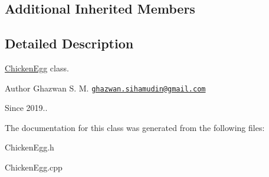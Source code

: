 \subsection*{Additional Inherited Members}


\subsection{Detailed Description}
\hyperlink{classChickenEgg}{Chicken\+Egg} class.

\begin{DoxyAuthor}{Author}
Ghazwan S. M. \href{mailto:ghazwan.sihamudin@gmail.com}{\tt ghazwan.\+sihamudin@gmail.\+com} 
\end{DoxyAuthor}
\begin{DoxySince}{Since}
2019.. 
\end{DoxySince}


The documentation for this class was generated from the following files\+:\begin{DoxyCompactItemize}
\item 
Chicken\+Egg.\+h\item 
Chicken\+Egg.\+cpp\end{DoxyCompactItemize}
